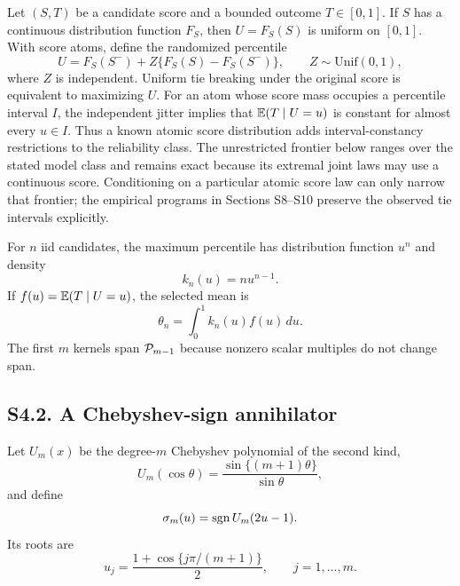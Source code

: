Let $(S,T)$ be a candidate score and a bounded outcome $T\in[0,1]$. If $S$ has a continuous distribution function $F_S$, then $U=F_S(S)$ is uniform on $[0,1]$. With score atoms, define the randomized percentile
\begin{equation}
U=F_S(S^-)+Z\{F_S(S)-F_S(S^-)\},
\qquad Z\sim\mathrm{Unif}(0,1),
\label{si:eq:randomized-percentile}
\end{equation}
where $Z$ is independent. Uniform tie breaking under the original score is equivalent to maximizing $U$.
For an atom whose score mass occupies a percentile interval $I$, the independent
jitter implies that $\mathbb{E}(T\mid U=u)$ is constant for almost every $u\in I$.
Thus a known atomic score distribution adds interval-constancy restrictions to
the reliability class. The unrestricted frontier below ranges over the stated
model class and remains exact because its extremal joint laws may use a
continuous score. Conditioning on a particular atomic score law can only
narrow that frontier; the empirical programs in Sections S8--S10 preserve the
observed tie intervals explicitly.

For $n$ iid candidates, the maximum percentile has distribution function $u^n$ and density
\begin{equation}
k_n(u)=nu^{n-1}.
\label{si:eq:winner-kernel}
\end{equation}
If $f(u)=\mathbb{E}(T\mid U=u)$, the selected mean is
\begin{equation}
\theta_n=\int_0^1k_n(u)f(u)\,du.
\label{si:eq:selected-mean}
\end{equation}
The first $m$ kernels span $\mathcal P_{m-1}$ because nonzero scalar multiples do not change span.

\subsection*{S4.2. A Chebyshev-sign annihilator}

Let $U_m(x)$ be the degree-$m$ Chebyshev polynomial of the second kind,
\begin{equation}
U_m(\cos\theta)=\frac{\sin\{(m+1)\theta\}}{\sin\theta},
\label{si:eq:cheby-definition}
\end{equation}
and define
\begin{equation}
\sigma_m(u)=\operatorname{sgn} U_m(2u-1).
\label{si:eq:sigma}
\end{equation}
Its roots are
\begin{equation}
u_j=\frac{1+\cos\{j\pi/(m+1)\}}2,
\qquad j=1,\ldots,m.
\label{si:eq:nodes}
\end{equation}

